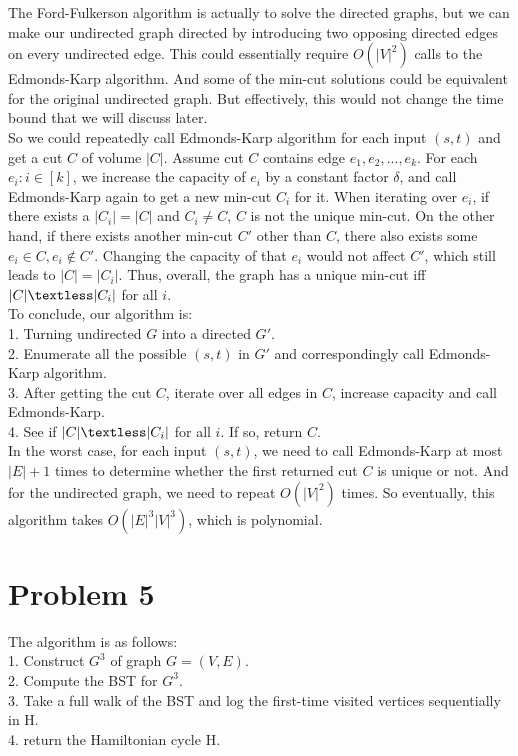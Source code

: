 \documentclass[titlepage, paper=a4, fontsize=11pt]{scrartcl} %
\numberwithin{equation}{section} %
\numberwithin{figure}{section} %
\numberwithin{table}{section} %
\begin{document}
The Ford-Fulkerson algorithm is actually to solve the directed graphs, but we can make our undirected graph directed by introducing two opposing directed edges on every undirected edge. This could essentially require $O(|V|^2)$ calls to the Edmonds-Karp algorithm. And some of the min-cut solutions could be equivalent for the original undirected graph. But effectively, this would not change the time bound that we will discuss later. \\

So we could repeatedly call Edmonds-Karp algorithm for each input $(s, t)$ and get a cut $C$ of volume $|C|$. Assume cut $C$ contains edge $e_1, e_2, ... , e_k$. For each $e_i: i \in [k]$, we increase the capacity of $e_i$ by a constant factor $\delta$, and call Edmonds-Karp again to get a new min-cut $C_i$ for it. When iterating over $e_i$, if there exists a $|C_i|=|C|$ and $C_i \neq C$, $C$ is not the unique min-cut. On the other hand, if there exists another min-cut $C'$ other than $C$, there also exists some $e_i \in C, e_i \notin C'$. Changing the capacity of that $e_i$ would not affect $C'$, which still leads to $|C|=|C_i|$. Thus, overall, the graph has a unique min-cut iff $|C| \textless |C_i|$ for all $i$. \\

To conclude, our algorithm is: \\
1. Turning undirected $G$ into a directed $G'$. \\
2. Enumerate all the possible $(s, t)$ in $G'$ and correspondingly call Edmonds-Karp algorithm. \\
3. After getting the cut $C$, iterate over all edges in $C$, increase capacity and call Edmonds-Karp. \\
4. See if $|C| \textless |C_i|$ for all $i$. If so, return $C$. \\

In the worst case, for each input $(s, t)$, we need to call Edmonds-Karp at most $|E|+1$ times to determine whether the first returned cut $C$ is unique or not. And for the undirected graph, we need to repeat $O(|V|^2)$ times. So eventually, this algorithm takes $O(|E|^3|V|^3)$, which is polynomial. \\




\section*{Problem 5}
The algorithm is as follows: \\
1. Construct $G^3$ of graph $G = (V, E)$. \\
2. Compute the BST for $G^3$. \\
3. Take a full walk of the BST and log the first-time visited vertices sequentially in H. \\
4. return the Hamiltonian cycle H. \\
\end{document}
